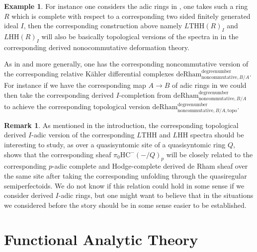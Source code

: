 \documentclass[11pt]{book}
\theoremstyle{definition}
\newtheorem{remark}[theorem]{Remark}
\numberwithin{equation}{section}
\newtheorem{example}[theorem]{Example}
\begin{document}
\begin{example}
For instance one considers the adic rings in \cite[Section 1.4]{12FK}, one takes such a ring $R$ which is complete with respect to a corresponding two sided finitely generated ideal $I$, then the corresponding construction above namely $L\mathrm{THH}(R)_I$ and $L\mathrm{HH}(R)_I$ will also be basically topological versions of the spectra in \cite[Definition 1.3, Definition 1.4]{12ELS} in the corresponding derived nonocommutative deformation theory.
\end{example}



\indent As in \cite[Chapter 5]{12ELS} and more generally, one has the corresponding noncommutative version of the corresponding relative K\"ahler differential complexes $\mathrm{deRham}^\text{degreenumber}_{\mathrm{noncommutative}, B/A}$. For instance if we have the corresponding map $A\rightarrow B$ of adic rings in \cite[Section 1.4]{12FK} we could then take the corresponding derived $I$-completion from $\mathrm{deRham}^\text{degreenumber}_{\mathrm{noncommutative}, B/A}$ to achieve the corresponding topological version $\mathrm{deRham}^\text{degreenumber}_{\mathrm{noncommutative}, B/A,\mathrm{topo}}$.  


\begin{remark}
As mentioned in the introduction, the corresponding topological derived $I$-adic version of the corresponding $L$THH and $L$HH spectra should be interesting to study, as over a quasisyntomic site of a quasisyntomic ring $Q$, \cite[Proposition 5.15]{12BMS} shows that the corresponding sheaf $\pi_0\mathrm{HC}^-(-/Q)_p$ will be closely related to the corresponding $p$-adic complete and Hodge-complete derived de Rham sheaf over the same site after taking the corresponding unfolding through the quasiregular semiperfectoids. We do not know if this relation could hold in some sense if we consider derived $I$-adic rings, but one might want to believe that in the situations we considered before the story should be in some sense easier to be established.	
\end{remark}










\newpage


\chapter{Functional Analytic Theory}
\end{document}
